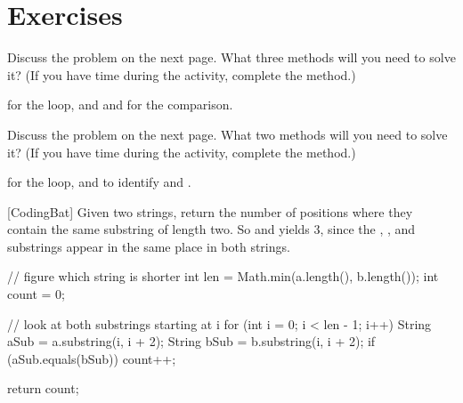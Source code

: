 

\section*{Exercises}


\Q \label{stringMatch}
Discuss the  problem on the next page.
What three  methods will you need to solve it?
(If you have time during the activity, complete the method.)

\begin{answer}[3em]
 for the loop, and  and  for the comparison.
\end{answer}


\Q \label{stringYak}
Discuss the  problem on the next page.
What two  methods will you need to solve it?
(If you have time during the activity, complete the method.)

\begin{answer}[3em]
 for the loop, and  to identify  and .
\end{answer}


\newpage

[CodingBat] Given two strings, return the number of positions where they contain the same substring of length two. So  and  yields 3, since the , , and  substrings appear in the same place in both strings.

\medskip
\begin{javalst}
public static int stringMatch(String a, String b) {
\end{javalst}

\vspace{-1ex}
\begin{answer}[18em]
\begin{javaans}
    // figure which string is shorter
    int len = Math.min(a.length(), b.length());
    int count = 0;

    // look at both substrings starting at i
    for (int i = 0; i < len - 1; i++) {
        String aSub = a.substring(i, i + 2);
        String bSub = b.substring(i, i + 2);
        if (aSub.equals(bSub)) {
            count++;
        }
    }

    return count;
\end{javaans}
\end{answer}
\vspace{-1ex}

